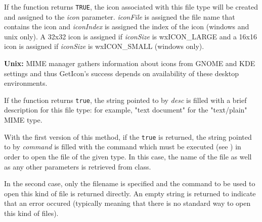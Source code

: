 \label{wxfiletypegeticon}


If the function returns {\tt TRUE}, the icon associated with this file type will be
created and assigned to the {\it icon} parameter. {\it iconFile} is assigned the file name
that contains the icon and {\it iconIndex} is assigned the index of the icon
(windows and unix only). A 32x32 icon is assigned if {\it iconSize} is wxICON\_LARGE
and a 16x16 icon is assigned if {\it iconSize} is wxICON\_SMALL (windows only).

{\bf Unix:} MIME manager gathers information about icons from GNOME
and KDE settings and thus GetIcon's success depends on availability
of these desktop environments.

\label{wxfiletypegetdescription}


If the function returns {\tt true}, the string pointed to by {\it desc} is filled
with a brief description for this file type: for example, "text document" for
the "text/plain" MIME type.

\label{wxfiletypegetopencommand}



With the first version of this method, if the {\tt true} is returned, the
string pointed to by {\it command} is filled with the command which must be
executed (see ) in order to open the file of the
given type. In this case, the name of the file as well as any other parameters
is retrieved from  
class.

In the second case, only the filename is specified and the command to be used
to open this kind of file is returned directly. An empty string is returned to
indicate that an error occured (typically meaning that there is no standard way
to open this kind of files).

\label{wxfiletypegetprintcommand}

